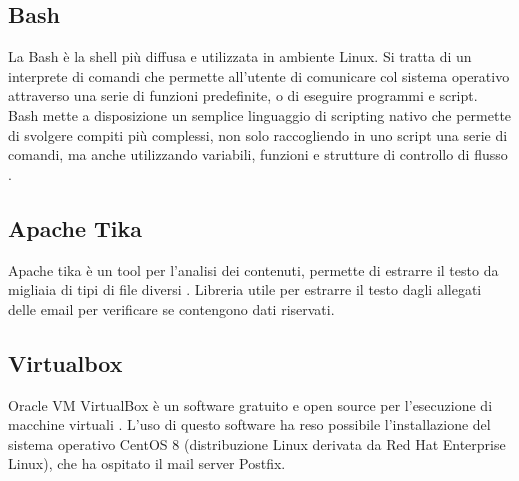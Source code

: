     
    \subsection{Bash}
    La Bash è la shell più diffusa e utilizzata in ambiente Linux. 
    Si tratta di un interprete di comandi che permette all'utente di comunicare col sistema operativo attraverso una
    serie di funzioni predefinite, o di eseguire programmi e script.
    Bash mette a disposizione un semplice linguaggio di scripting nativo che permette di svolgere compiti 
    più complessi, non solo raccogliendo in uno script una serie di comandi, 
    ma anche utilizzando variabili, funzioni e strutture di controllo di flusso \cite{Bash1}.
    
    \subsection{Apache Tika}
    Apache tika è un tool per l’analisi dei contenuti, permette di estrarre il testo da migliaia di tipi di file diversi \cite{tika}.
    Libreria utile per estrarre il testo dagli allegati delle email per verificare se contengono dati riservati. 
    
    \subsection{Virtualbox}
    Oracle VM VirtualBox è un software gratuito e open source per l'esecuzione di macchine virtuali \cite{VirtualBox1}.
    L'uso di questo software ha reso possibile l'installazione del sistema operativo CentOS 8 
    (distribuzione Linux derivata da Red Hat Enterprise Linux), che ha ospitato il mail server Postfix.